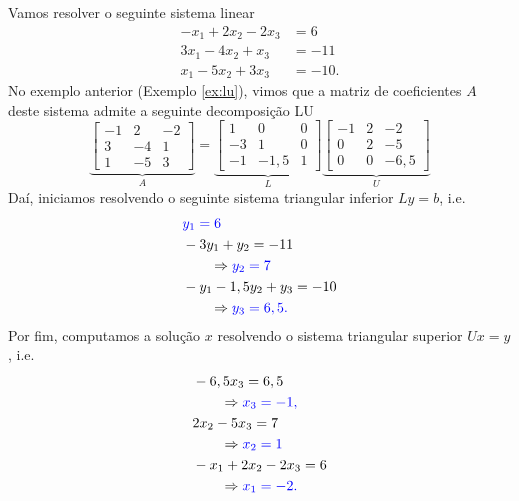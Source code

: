 \begin{ex}\label{ex:lu}
  Vamos resolver o seguinte sistema linear
  \begin{equation}
    \begin{aligned}
      -x_1 + 2x_2 - 2x_3 &= 6\\
      3x_1 - 4x_2 + x_3 &= -11\\
      x_1 - 5x_2 + 3x_3 &= -10.
    \end{aligned}
\end{equation}
  No exemplo anterior (Exemplo \ref{ex:lu}), vimos que a matriz de coeficientes $A$ deste sistema admite a seguinte decomposição LU
  \begin{equation}
    \underbrace{\begin{bmatrix}
      -1 & 2 & -2\\
      3 & -4 & 1\\
      1 & -5 & 3
    \end{bmatrix}}_{A} =
  \underbrace{\begin{bmatrix}
      1 & 0 & 0\\
      -3 & 1 & 0\\
      -1 & -1,5 & 1
    \end{bmatrix}}_{L}
  \underbrace{\begin{bmatrix}
      -1 & 2 & -2\\
      0 & 2 & -5\\
      0 & 0 & -6,5
    \end{bmatrix}}_{U}
  \end{equation}
  Daí, iniciamos resolvendo o seguinte sistema triangular inferior $Ly = b$, i.e.
  \begin{align}
    &\color{blue}y_1 = 6 \\
    &-3y_1 + y_2 = -11 \\
    &\qquad\Rightarrow \color{blue}y_2 = 7\\
    &-y_1 - 1,5y_2 + y_3 = -10 \\
    &\qquad\Rightarrow \color{blue}y_3 = 6,5.
  \end{align}
  Por fim, computamos a solução $x$ resolvendo o sistema triangular superior $Ux=y$, i.e.
  \begin{align}
    &-6,5x_3 = 6,5 \\
    &\qquad \Rightarrow \color{blue}x_3 = -1,\\
    &2x_2 - 5x_3 = 7 \\
    &\qquad \Rightarrow \color{blue}x_2 = 1\\
    &-x_1 + 2x_2 - 2x_3 = 6 \\
    &\qquad \Rightarrow \color{blue}x_1 = -2.
  \end{align}


\end{ex}
